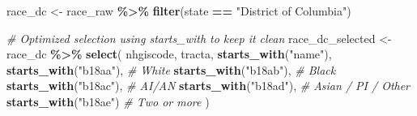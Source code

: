 \documentclass[
]{article}
\newenvironment{Shaded}{\begin{snugshade}}{\end{snugshade}}
\newcommand{\CommentTok}[1]{\textcolor[rgb]{0.56,0.35,0.01}{\textit{#1}}}
\newcommand{\FunctionTok}[1]{\textcolor[rgb]{0.13,0.29,0.53}{\textbf{#1}}}
\newcommand{\NormalTok}[1]{#1}
\newcommand{\OtherTok}[1]{\textcolor[rgb]{0.56,0.35,0.01}{#1}}
\newcommand{\SpecialCharTok}[1]{\textcolor[rgb]{0.81,0.36,0.00}{\textbf{#1}}}
\newcommand{\StringTok}[1]{\textcolor[rgb]{0.31,0.60,0.02}{#1}}
\begin{document}
\begin{Shaded}
\begin{Highlighting}[]
\NormalTok{race\_dc }\OtherTok{\textless{}{-}}\NormalTok{ race\_raw }\SpecialCharTok{\%\textgreater{}\%}
  \FunctionTok{filter}\NormalTok{(state }\SpecialCharTok{==} \StringTok{"District of Columbia"}\NormalTok{)}

\CommentTok{\# Optimized selection using starts\_with to keep it clean}
\NormalTok{race\_dc\_selected }\OtherTok{\textless{}{-}}\NormalTok{ race\_dc }\SpecialCharTok{\%\textgreater{}\%}
  \FunctionTok{select}\NormalTok{(}
\NormalTok{    nhgiscode,}
\NormalTok{    tracta,}
    \FunctionTok{starts\_with}\NormalTok{(}\StringTok{"name"}\NormalTok{),}
    \FunctionTok{starts\_with}\NormalTok{(}\StringTok{"b18aa"}\NormalTok{), }\CommentTok{\# White}
    \FunctionTok{starts\_with}\NormalTok{(}\StringTok{"b18ab"}\NormalTok{), }\CommentTok{\# Black}
    \FunctionTok{starts\_with}\NormalTok{(}\StringTok{"b18ac"}\NormalTok{), }\CommentTok{\# AI/AN}
    \FunctionTok{starts\_with}\NormalTok{(}\StringTok{"b18ad"}\NormalTok{), }\CommentTok{\# Asian / PI / Other}
    \FunctionTok{starts\_with}\NormalTok{(}\StringTok{"b18ae"}\NormalTok{)  }\CommentTok{\# Two or more}
\NormalTok{  )}
\end{Highlighting}
\end{Shaded}
\end{document}
